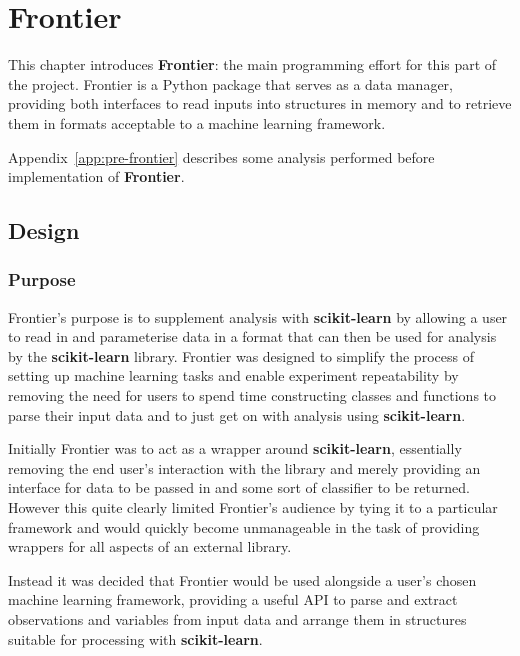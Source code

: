 \chapter{Frontier}
\ifpdf
    \graphicspath{{Chapter3/Figs/Raster/}{Chapter3/Figs/PDF/}{Chapter3/Figs/}}
\else
    \graphicspath{{Chapter3/Figs/Vector/}{Chapter3/Figs/}}
\fi


This chapter introduces \textbf{Frontier}: the main programming effort for this
part of the project. Frontier is a Python package that serves as a data manager,
providing both interfaces to read inputs into structures in memory and to
retrieve them in formats acceptable to a machine learning framework.

Appendix~\ref{app:pre-frontier} describes some analysis performed before
implementation of \textbf{Frontier}.

\section{Design}
\subsection{Purpose}

Frontier's purpose is to supplement analysis with \textbf{scikit-learn} by
allowing a user to read in and parameterise data in a format that can then be
used for analysis by the \textbf{scikit-learn} library.  Frontier was designed
to simplify the process of setting up machine learning tasks and enable
experiment repeatability by removing the need for users to spend time
constructing classes and functions to parse their input data and to just get on
with analysis using \textbf{scikit-learn}.

Initially Frontier was to act as a wrapper around \textbf{scikit-learn},
essentially removing the end user's interaction with the library and merely
providing an interface for data to be passed in and some sort of classifier to
be returned. However this quite clearly limited Frontier's audience by tying it
to a particular framework and would quickly become unmanageable in the task of
providing wrappers for all aspects of an external library.

Instead it was decided that Frontier would be used alongside a user's chosen
machine learning framework, providing a useful API to parse and extract
observations and variables from input data and arrange them in structures
suitable for processing with \textbf{scikit-learn}.

